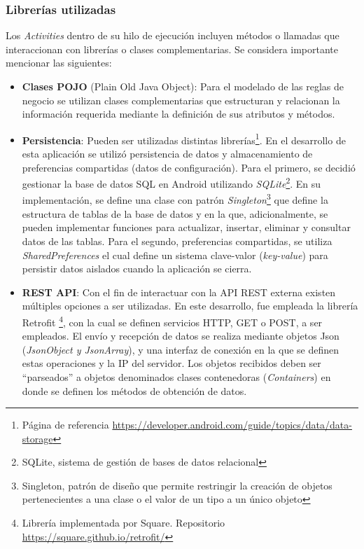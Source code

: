     \subsubsection{Librerías utilizadas}
     \par Los \textit{Activities} dentro de su hilo de ejecución incluyen métodos o llamadas que interaccionan con librerías o clases complementarias. Se considera importante mencionar las siguientes:
     \begin{itemize}
         \item \textbf{Clases POJO} (Plain Old Java Object): Para el modelado de las reglas de negocio se utilizan clases complementarias que estructuran y relacionan la información requerida mediante la definición de sus atributos y métodos.
         
         \item \textbf{Persistencia}: Pueden ser utilizadas distintas librerías\footnote{Página de referencia \url{https://developer.android.com/guide/topics/data/data-storage}}. En el desarrollo de esta aplicación se utilizó persistencia de datos y almacenamiento de preferencias compartidas (datos de configuración). Para el primero, se decidió gestionar la base de datos SQL en Android utilizando \textit{SQLite}\footnote{SQLite, sistema de gestión de bases de datos relacional}. En su implementación, se define una clase con patrón \textit{Singleton}\footnote{Singleton, patrón de diseño que permite restringir la creación de objetos pertenecientes a una clase o el valor de un tipo a un único objeto} que define la estructura de tablas de la base de datos y en la que, adicionalmente, se pueden implementar funciones para actualizar, insertar, eliminar y consultar datos de las tablas. Para el segundo, preferencias compartidas, se utiliza \textit{SharedPreferences} el cual define un sistema clave-valor (\textit{key-value}) para persistir datos aislados cuando la aplicación se cierra.
         
         \item \textbf{REST API}: Con el fin de interactuar con la API REST externa existen múltiples opciones a ser utilizadas. En este desarrollo, fue empleada la librería Retrofit \footnote{Librería implementada por Square. Repositorio \url{https://square.github.io/retrofit/}}, con la cual se definen servicios HTTP, GET o POST, a ser empleados. El envío y recepción de datos se realiza mediante objetos Json (\textit{JsonObject y JsonArray}), y una interfaz de conexión en la que se definen estas operaciones y la IP del servidor. Los objetos recibidos deben ser ``parseados'' a objetos denominados clases contenedoras (\textit{Containers}) en donde se definen los métodos de obtención de datos. 
         

\end{itemize}
